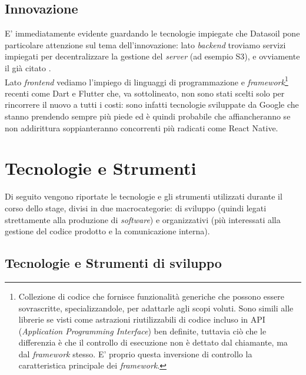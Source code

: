 \subsection{Innovazione}
E' immediatamente evidente guardando le tecnologie impiegate che Datasoil pone particolare attenzione sul tema dell'innovazione: lato \textit{backend} troviamo servizi \aws{} impiegati per decentralizzare la gestione del \textit{server} (ad esempio S3), e ovviamente il già citato \asa{}.\\
Lato \textit{frontend} vediamo l'impiego di linguaggi di programmazione e \textit{framework}\footnote{Collezione di codice che fornisce funzionalità generiche che possono essere sovrascritte, specializzandole, per adattarle agli scopi voluti. Sono simili alle librerie se visti come astrazioni riutilizzabili di codice incluso in API (\textit{Application Programming Interface}) ben definite, tuttavia ciò che le differenzia è che il controllo di esecuzione non è dettato dal chiamante, ma dal \textit{framework} stesso. E' proprio questa inversione di controllo la caratteristica principale dei \textit{framework}.} recenti come Dart e Flutter che, va sottolineato, non sono stati scelti solo per rincorrere il nuovo a tutti i costi: sono infatti tecnologie sviluppate da Google che stanno prendendo sempre più piede ed è quindi probabile che affiancheranno se non addirittura soppianteranno concorrenti più radicati come React Native.


\section{Tecnologie e Strumenti}
\label{sec:tecnologie-e-strumenti}
Di seguito vengono riportate le tecnologie e gli strumenti utilizzati durante il corso dello stage, divisi in due macrocategorie: di sviluppo (quindi legati strettamente alla produzione di \textit{software}) e organizzativi (più interessati alla gestione del codice prodotto e la comunicazione interna).

\subsection{Tecnologie e Strumenti di sviluppo}

